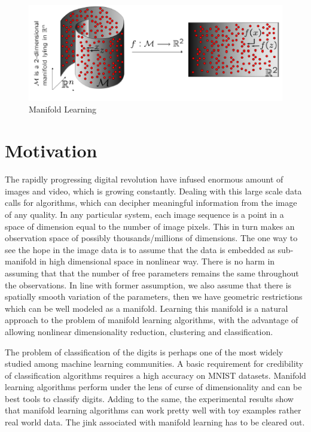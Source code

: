 \begin{figure}[ht]
\begin{center}
\includegraphics[width=\textwidth]{./Figures/manifold.png}
\caption{Manifold Learning \citep{Ety2008}}
\label{fig:manifold}
\end{center}
\end{figure}

\section{Motivation}

The rapidly progressing digital revolution have infused enormous amount of images and video, which is growing constantly. Dealing with this large scale data calls for algorithms, which can decipher meaningful information from the image of any quality. In any particular system, each image sequence is a point in a space of dimension equal to the number of image pixels. This in turn makes an observation space of possibly thousands/millions of dimensions. The one way to see the hope in the image data is to assume that the data is embedded as sub-manifold in high dimensional space in nonlinear way. There is no harm in assuming that that the number of free parameters remains the same throughout the observations. In line with former assumption, we also assume that there is spatially smooth variation of the parameters, then we have geometric restrictions which can be well modeled as a manifold. Learning this manifold is a natural approach to the problem of manifold learning algorithms, with the advantage of allowing nonlinear dimensionality reduction, clustering and classification.

The problem of classification of the digits is perhaps one of the most widely studied among machine learning communities. A basic requirement for credibility of classification algorithms  requires a high accuracy on MNIST datasets. Manifold learning algorithms perform under the lens of curse of dimensionality and can be best tools to classify digits. Adding to the same, the experimental results show that manifold learning algorithms can work pretty well with toy examples rather real world data. The jink associated with manifold learning has to be cleared out.


